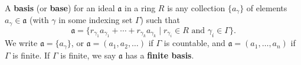 A \textbf{basis} (or \textbf{base}) for an ideal $\mathfrak{a}$ in a ring $R$ is any collection $\{a_\gamma\}$ of elements $a_\gamma \in \mathfrak{a}$ (with $\gamma$ in some indexing set $\Gamma$) such that
$$\mathfrak{a} = \{ r_{\gamma_1} a_{\gamma_1} + \cdots + r_{\gamma_k} a_{\gamma_k} \mid r_{\gamma_i} \in R \text{ and } \gamma_i \in \Gamma \}.$$
We write $\mathfrak{a} = \{a_\gamma\}$, or $\mathfrak{a} = (a_1, a_2, \ldots)$ if $\Gamma$ is countable, and $\mathfrak{a} = (a_1, \ldots, a_n)$ if $\Gamma$ is finite. If $\Gamma$ is finite, we say $\mathfrak{a}$ has a \textbf{finite basis}.
